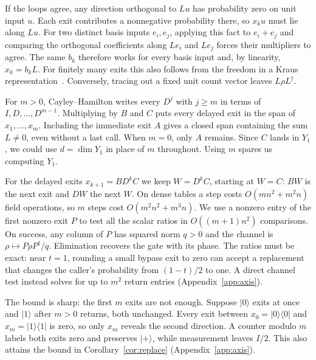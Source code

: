 \documentclass[acmsmall,screen,review,anonymous,nonacm]{acmart}
\newcommand{\ket}[1]{\lvert #1\rangle}
\newcommand{\bra}[1]{\langle #1\rvert}
\numberwithin{equation}{section}
\begin{document}
If the loops agree, any direction orthogonal to $Lu$ has probability zero on
unit input $u$. Each exit contributes a nonnegative probability there, so
$x_k u$ must lie along $Lu$. For two distinct basis inputs $e_i,e_j$, applying
this fact to $e_i+e_j$ and comparing the orthogonal coefficients along $Le_i$ and
$Le_j$ forces their multipliers to agree. The same $b_k$ therefore works for every basis input and, by linearity, $x_k=b_kL$. For finitely many exits this
also follows from the freedom in a Kraus representation~\cite[Cor.~2.23]{Watrous18TQI}.
Conversely, tracing out a fixed unit count vector leaves $L\rho L^\dagger$.

For $m>0$, Cayley--Hamilton writes every $D^j$ with $j\ge m$ in terms of $I,D,\ldots,D^{m-1}$. Multiplying by $B$ and $C$ puts every delayed exit in the span of $x_1,\ldots,x_m$. Including the immediate exit $A$ gives a closed span containing the sum $L\ne0$, even without a last call. When $m=0$, only $A$ remains. Since $C$ lands in $Y_1$, we could use $d=\dim Y_1$ in place of $m$ throughout. Using $m$ spares us computing $Y_1$.

For the delayed exits $x_{k+1}=BD^kC$ we keep $W=D^kC$, starting at $W=C$: $BW$ is the next exit and $DW$ the next $W$. On dense tables a step costs $O(mn^2+m^2n)$ field operations, so $m$ steps cost $O(m^2n^2+m^3n)$. We use a nonzero entry of the first nonzero exit $P$ to test all the scalar ratios in $O((m+1)n^2)$ comparisons. On success, any column of $P$ has squared norm $q>0$ and the channel is $\rho\mapsto P\rho P^\dagger/q$. Elimination recovers the gate with its phase. The ratios must be exact: near $t=1$, rounding a small bypass exit to zero can accept a replacement that changes the caller's probability from $(1-t)/2$ to one. A direct channel test instead solves for up to $m^2$ return entries (Appendix~\ref{app:axis}).

The bound is sharp: the first $m$ exits are not enough. Suppose $\ket0$ exits at once and $\ket1$ after $m>0$ returns, both unchanged. Every exit between $x_0=\ket0\bra0$ and $x_m=\ket1\bra1$ is zero, so only $x_m$ reveals the second direction. A counter modulo $m$ labels both exits zero and preserves $\ket+$, while measurement leaves $I/2$. This also attains the bound in Corollary~\ref{cor:replace} (Appendix~\ref{app:axis}).
\end{document}
